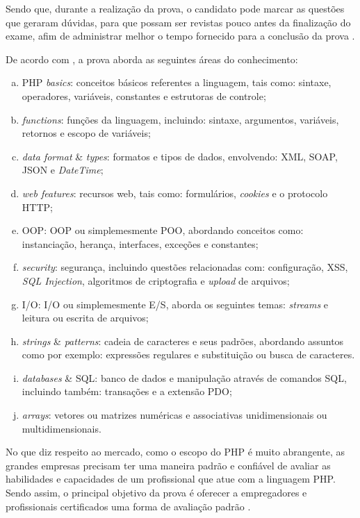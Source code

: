 Sendo que, durante a realização da prova, o candidato pode marcar as questões
que geraram dúvidas, para que possam ser revistas pouco antes da finalização do
exame, afim de administrar melhor o tempo fornecido para a conclusão da  prova
\cite{entrevistaAriZCEBrasil}.

De acordo com , a prova aborda as seguintes
áreas do conhecimento:

\begin{enumerate}[a)]
    \item \acs{PHP} \textit{basics}: conceitos básicos referentes a
    linguagem, tais como: sintaxe, operadores, variáveis, constantes e
    estrutoras de controle;
    \item \textit{functions}: funções da linguagem, incluindo: sintaxe,
    argumentos, variáveis, retornos e escopo de variáveis;
    \item \textit{data format} \& \textit{types}: formatos e tipos de
    dados, envolvendo: \ac{XML}, \ac{SOAP}, \ac{JSON} e \textit{DateTime};
    \item \textit{web features}: recursos web, tais como: formulários,
    \textit{cookies} e o protocolo \ac{HTTP};
    \item \acs{OOP}: \acl{OOP} ou simplemesmente \ac{POO},
    abordando conceitos como: instanciação, herança, interfaces, exceções e
    constantes;
    \item \textit{security}: segurança, incluindo questões relacionadas com:
    configuração, \ac{XSS}, \textit{\acs{SQL} Injection},
    algoritmos de criptografia e \textit{upload} de arquivos;
    \item \acs{I/O}: \acl{I/O} ou simplemesmente \ac{E/S}, aborda os seguintes
    temas: \textit{streams} e leitura ou escrita de arquivos;
    \item \textit{strings} \& \textit{patterns}: cadeia de caracteres e
    seus padrões, abordando assuntos como por exemplo: expressões
    regulares e substituição ou busca de caracteres.
    \item \textit{databases} \& \acs{SQL}: banco de dados e
    manipulação através de comandos \ac{SQL}, incluindo também: transações e a
    extensão \ac{PDO};
    \item \textit{arrays}: vetores ou matrizes numéricas e 
    associativas unidimensionais ou multidimensionais.
\end{enumerate}

No que diz respeito ao mercado, como o escopo do \acs{PHP} é muito abrangente,
as grandes empresas precisam ter uma maneira padrão e confiável de avaliar as
habilidades e capacidades de um profissional que atue com a linguagem PHP. 
Sendo assim, o principal objetivo da prova é oferecer a empregadores e profissionais 
certificados uma forma de avaliação padrão \cite{zendPhp5CertificationStudyGuide}.


